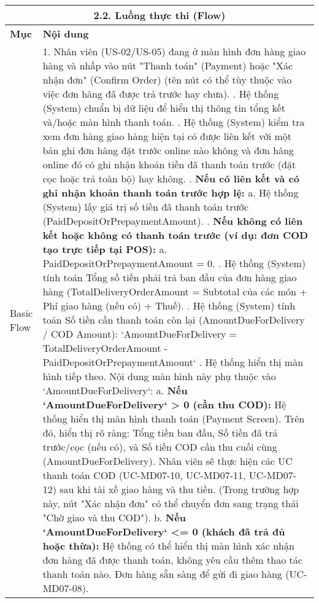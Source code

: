 \begin{longtable}{|m{4cm}|p{11cm}|}
\hline
\multicolumn{2}{|c|}{\textbf{2.2. Luồng thực thi (Flow)}} \\
\hline
\textbf{Mục} & \textbf{Nội dung} \\
\hline
Basic Flow & 1. Nhân viên (US-02/US-05) đang ở màn hình đơn hàng giao hàng và nhấp vào nút "Thanh toán" (Payment) hoặc "Xác nhận đơn" (Confirm Order) (tên nút có thể tùy thuộc vào việc đơn hàng đã được trả trước hay chưa). \newline 2. Hệ thống (System) chuẩn bị dữ liệu để hiển thị thông tin tổng kết và/hoặc màn hình thanh toán. \newline 3. Hệ thống (System) kiểm tra xem đơn hàng giao hàng hiện tại có được liên kết với một bản ghi đơn hàng đặt trước online nào không và đơn hàng online đó có ghi nhận khoản tiền đã thanh toán trước (đặt cọc hoặc trả toàn bộ) hay không. \newline 4. \textbf{Nếu có liên kết và có ghi nhận khoản thanh toán trước hợp lệ:} \newline    a. Hệ thống (System) lấy giá trị số tiền đã thanh toán trước (PaidDepositOrPrepaymentAmount). \newline 5. \textbf{Nếu không có liên kết hoặc không có thanh toán trước (ví dụ: đơn COD tạo trực tiếp tại POS):} \newline    a. PaidDepositOrPrepaymentAmount = 0. \newline 6. Hệ thống (System) tính toán Tổng số tiền phải trả ban đầu của đơn hàng giao hàng (TotalDeliveryOrderAmount = Subtotal của các món + Phí giao hàng (nếu có) + Thuế). \newline 7. Hệ thống (System) tính toán Số tiền cần thanh toán còn lại (AmountDueForDelivery / COD Amount): \newline    `AmountDueForDelivery = TotalDeliveryOrderAmount - PaidDepositOrPrepaymentAmount` \newline 8. Hệ thống hiển thị màn hình tiếp theo. Nội dung màn hình này phụ thuộc vào `AmountDueForDelivery`: \newline    a. \textbf{Nếu `AmountDueForDelivery` > 0 (cần thu COD):} Hệ thống hiển thị màn hình thanh toán (Payment Screen). Trên đó, hiển thị rõ ràng: Tổng tiền ban đầu, Số tiền đã trả trước/cọc (nếu có), và Số tiền COD cần thu cuối cùng (AmountDueForDelivery). Nhân viên sẽ thực hiện các UC thanh toán COD (UC-MD07-10, UC-MD07-11, UC-MD07-12) sau khi tài xế giao hàng và thu tiền. (Trong trường hợp này, nút "Xác nhận đơn" có thể chuyển đơn sang trạng thái "Chờ giao và thu COD"). \newline    b. \textbf{Nếu `AmountDueForDelivery` <= 0 (khách đã trả đủ hoặc thừa):} Hệ thống có thể hiển thị màn hình xác nhận đơn hàng đã được thanh toán, không yêu cầu thêm thao tác thanh toán nào. Đơn hàng sẵn sàng để gửi đi giao hàng (UC-MD07-08). \\

\end{longtable}
